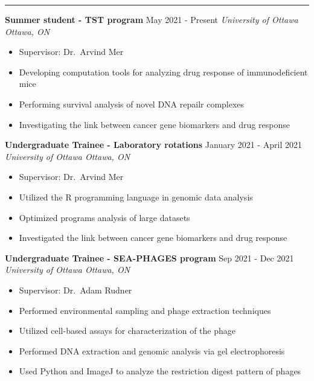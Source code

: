 \vspace{1em}

 \vspace{-1em} \noindent

\rule{18cm}{0.5pt}

\textbf{Summer student - TST program} \hfill May 2021 - Present
\linebreak \emph{University of Ottawa \hfill Ottawa, ON}

\begin{itemize}
\tightlist
\item
  Supervisor: Dr.~Arvind Mer
\item
  Developing computation tools for analyzing drug response of
  immunodeficient mice
\item
  Performing survival analysis of novel DNA repailr complexes
\item
  Investigating the link between cancer gene biomarkers and drug
  response
\end{itemize}

\textbf{Undergraduate Trainee - Laboratory rotations} \hfill January
2021 - April 2021 \linebreak \emph{University of Ottawa \hfill Ottawa,
ON}

\begin{itemize}
\tightlist
\item
  Supervisor: Dr.~Arvind Mer
\item
  Utilized the R programming language in genomic data analysis
\item
  Optimized programs analysis of large datasets
\item
  Investigated the link between cancer gene biomarkers and drug response
\end{itemize}

\textbf{Undergraduate Trainee - SEA-PHAGES program} \hfill Sep 2021 -
Dec 2021 \linebreak \emph{University of Ottawa \hfill Ottawa, ON}

\begin{itemize}
\tightlist
\item
  Supervisor: Dr.~Adam Rudner
\item
  Performed environmental sampling and phage extraction techniques
\item
  Utilized cell-based assays for characterization of the phage
\item
  Performed DNA extraction and genomic analysis via gel electrophoresis
\item
  Used Python and ImageJ to analyze the restriction digest pattern of
  phages
\end{itemize}

